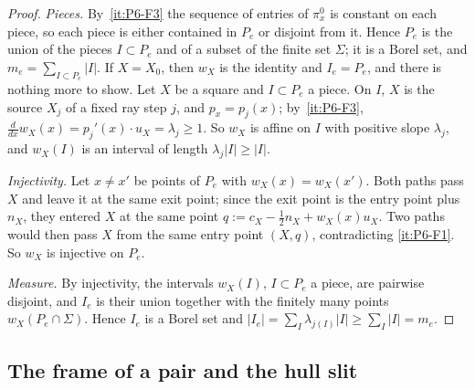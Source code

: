 \documentclass[11pt]{amsart}
\theoremstyle{definition}
\theoremstyle{remark}
\numberwithin{equation}{section}
\begin{document}
\begin{proof}
\emph{Pieces.} By~\ref{it:P6-F3} the sequence of entries of $\pi^0_x$ is constant on each piece, so each piece is
either contained in $P_e$ or disjoint from it. Hence $P_e$ is the union of the pieces $I\subset P_e$ and of a subset
of the finite set $\Sigma$; it is a Borel set, and $m_e=\sum_{I\subset P_e}|I|$. If $X=X_0$, then $w_X$ is the
identity and $I_e=P_e$, and there is nothing more to show. Let $X$ be a square and $I\subset P_e$ a piece. On $I$,
$X$ is the source $X_j$ of a fixed ray step $j$, and $p_x=p_j(x)$; by~\ref{it:P6-F3},
$\frac{d}{dx}w_X(x)=p_j'(x)\cdot u_X=\lambda_j\ge1$. So $w_X$ is affine on $I$ with positive slope $\lambda_j$, and
$w_X(I)$ is an interval of length $\lambda_j|I|\ge|I|$.

\emph{Injectivity.} Let $x\neq x'$ be points of $P_e$ with $w_X(x)=w_X(x')$. Both paths pass $X$ and leave it at the
same exit point; since the exit point is the entry point plus $n_X$, they entered $X$ at the same point
$q:=c_X-\frac12n_X+w_X(x)u_X$. Two paths would then pass $X$ from the same entry point $(X,q)$, contradicting
\ref{it:P6-F1}. So $w_X$ is injective on $P_e$.

\emph{Measure.} By injectivity, the intervals $w_X(I)$, $I\subset P_e$ a piece, are pairwise disjoint, and $I_e$ is
their union together with the finitely many points $w_X(P_e\cap\Sigma)$. Hence $I_e$ is a Borel set and
$|I_e|=\sum_I\lambda_{j(I)}|I|\ge\sum_I|I|=m_e$.
\end{proof}

\subsection{The frame of a pair and the hull slit}\label{ssec:P6-hull}
\end{document}
